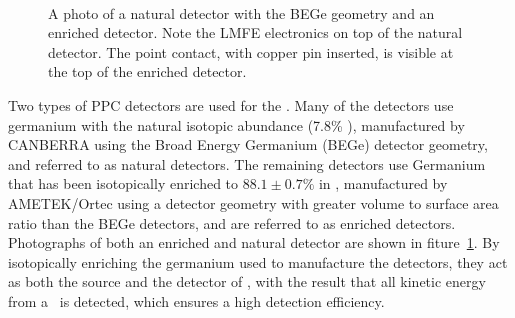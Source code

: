 \documentclass[/main.tex]{subfiles}
\begin{document}
\begin{figure}[h]
  \centering
  ~
  \caption[Natural and enriched detector photos]{\label{fig:detphotos}
    A photo of a natural detector with the BEGe geometry and an enriched detector. Note the LMFE electronics on top of the natural detector. The point contact, with copper pin inserted, is visible at the top of the enriched detector.
  }
\end{figure}
Two types of PPC detectors are used for the \MJD.
Many of the detectors use germanium with the natural isotopic abundance (7.8\% ), manufactured by CANBERRA using the Broad Energy Germanium (BEGe) detector geometry, and referred to as natural detectors.
The remaining detectors use Germanium that has been isotopically enriched to $88.1\pm0.7\%$ in , manufactured by AMETEK/Ortec using a detector geometry with greater volume to surface area ratio than the BEGe detectors, and are referred to as enriched detectors.
Photographs of both an enriched and natural detector are shown in fiture~\ref{fig:detphotos}.
By isotopically enriching the germanium used to manufacture the detectors, they act as both the source and the detector of \znbb, with the result that all kinetic energy from a \znbb\ is detected, which ensures a high detection efficiency.
\end{document}
